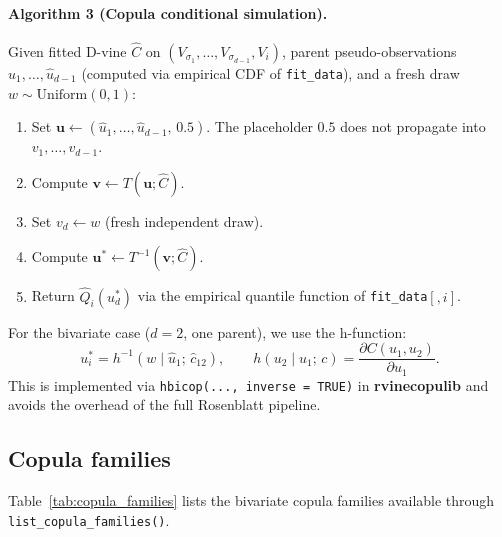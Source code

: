 \documentclass[12pt,a4paper]{article}
\newcommand{\pkg}[1]{\textbf{#1}}
\newcommand{\code}[1]{\texttt{#1}}
\newcommand{\fct}[1]{\mbox{\texttt{#1()}}}
\begin{document}
\paragraph{Algorithm 3 (Copula conditional simulation).}
Given fitted D-vine $\hat{C}$ on $(V_{\sigma_1},\ldots,V_{\sigma_{d-1}},V_i)$,
parent pseudo-observations $\hat{u}_1,\ldots,\hat{u}_{d-1}$ (computed via
empirical CDF of \code{fit\_data}), and a fresh draw $w\sim\mathrm{Uniform}(0,1)$:
\begin{enumerate}
  \item Set $\mathbf{u}\leftarrow(\hat{u}_1,\ldots,\hat{u}_{d-1},\, 0.5)$.
        The placeholder $0.5$ does not propagate into $v_1,\ldots,v_{d-1}$.
  \item Compute $\mathbf{v}\leftarrow T(\mathbf{u};\hat{C})$.
  \item Set $v_d \leftarrow w$ (fresh independent draw).
  \item Compute $\mathbf{u}^*\leftarrow T^{-1}(\mathbf{v};\hat{C})$.
  \item Return $\hat{Q}_i(u_d^*)$ via the empirical quantile function of
        \code{fit\_data}$[,i]$.
\end{enumerate}

\noindent For the bivariate case ($d=2$, one parent), we use the h-function:
\[
  u_i^* = h^{-1}(w \mid \hat{u}_1;\, \hat{c}_{12}), \qquad
  h(u_2\mid u_1;\,c) = \frac{\partial C(u_1,u_2)}{\partial u_1}.
\]
This is implemented via \code{hbicop(..., inverse = TRUE)} in
\pkg{rvinecopulib} and avoids the overhead of the full Rosenblatt pipeline.

\subsection{Copula families}
\label{sec:families}

Table~\ref{tab:copula_families} lists the bivariate copula families available
through \fct{list\_copula\_families}.
\end{document}
